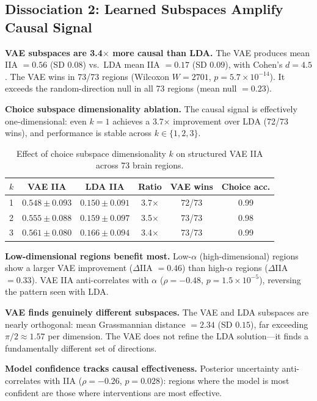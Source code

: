 \documentclass{article}
\begin{document}
\subsection{Dissociation 2: Learned Subspaces Amplify Causal Signal}

\textbf{VAE subspaces are 3.4$\times$ more causal than LDA.} The VAE produces mean IIA $= 0.56$ (SD $0.08$) vs.\ LDA mean IIA $= 0.17$ (SD $0.09$), with Cohen's $d = 4.5$. The VAE wins in 73/73 regions (Wilcoxon $W = 2701$, $p = 5.7 \times 10^{-14}$). It exceeds the random-direction null in all 73 regions (mean null $= 0.23$).

\textbf{Choice subspace dimensionality ablation.} The causal signal is effectively one-dimensional: even $k = 1$ achieves a 3.7$\times$ improvement over LDA (72/73 wins), and performance is stable across $k \in \{1, 2, 3\}$.

\begin{table}[h]
\centering
\small
\caption{Effect of choice subspace dimensionality $k$ on structured VAE IIA across 73 brain regions.}
\label{tab:vae_k_ablation}
\begin{tabular}{lccccc}
\toprule
$k$ & VAE IIA & LDA IIA & Ratio & VAE wins & Choice acc. \\
\midrule
1 & $0.548 \pm 0.093$ & $0.150 \pm 0.091$ & 3.7$\times$ & 72/73 & 0.99 \\
2 & $0.555 \pm 0.088$ & $0.159 \pm 0.097$ & 3.5$\times$ & 73/73 & 0.98 \\
3 & $0.561 \pm 0.080$ & $0.166 \pm 0.094$ & 3.4$\times$ & 73/73 & 0.99 \\
\bottomrule
\end{tabular}
\end{table}

\textbf{Low-dimensional regions benefit most.} Low-$\alpha$ (high-dimensional) regions show a larger VAE improvement ($\Delta$IIA $= 0.46$) than high-$\alpha$ regions ($\Delta$IIA $= 0.33$). VAE IIA anti-correlates with $\alpha$ ($\rho = -0.48$, $p = 1.5 \times 10^{-5}$), reversing the pattern seen with LDA.

\textbf{VAE finds genuinely different subspaces.} The VAE and LDA subspaces are nearly orthogonal: mean Grassmannian distance $= 2.34$ (SD $0.15$), far exceeding $\pi/2 \approx 1.57$ per dimension. The VAE does not refine the LDA solution---it finds a fundamentally different set of directions.

\textbf{Model confidence tracks causal effectiveness.} Posterior uncertainty anti-correlates with IIA ($\rho = -0.26$, $p = 0.028$): regions where the model is most confident are those where interventions are most effective.
\end{document}
